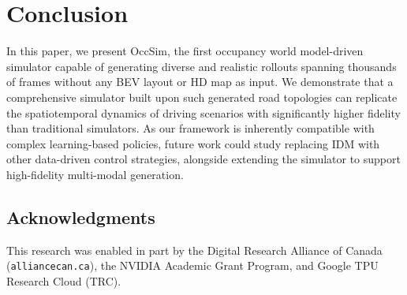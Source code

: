 \section{Conclusion}
In this paper, we present OccSim, the first occupancy world model-driven simulator capable of generating diverse and realistic rollouts spanning thousands of frames without any BEV layout or HD map as input. We demonstrate that a comprehensive simulator built upon such generated road topologies can replicate the spatiotemporal dynamics of driving scenarios with significantly higher fidelity than traditional simulators. As our framework is inherently compatible with complex learning-based policies, future work could study replacing IDM with other data-driven control strategies, alongside extending the simulator to support high-fidelity multi-modal generation.

\subsection*{Acknowledgments}
This research was enabled in part by the Digital Research Alliance of Canada (\texttt{alliancecan.ca}), the NVIDIA Academic Grant Program, and Google TPU Research Cloud (TRC).